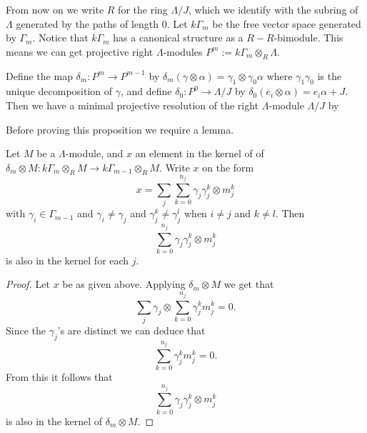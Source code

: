 From now on we write $R$ for the ring $\Lambda/J$, which we identify with the subring of $\Lambda$ generated by the paths of length 0. Let $k\Gamma_m$ be the free vector space generated by $\Gamma_m$. Notice that $k\Gamma_m$ has a canonical structure as a $R-R$-bimodule. This means we can get projective right $\Lambda$-modules $P^m := k\Gamma_m\otimes_R\Lambda$.

\begin{prop}\label{prop:projective_res_of_top_monomial_alg}
Define the map $\delta_m \colon P^m \to P^{m-1}$ by $\delta_m(\gamma \otimes \alpha) = \gamma_1 \otimes \gamma_0\alpha$ where $\gamma_1\gamma_0$ is the unique decomposition of $\gamma$, and define $\delta_0 \colon P^0 \to \Lambda /J$ by $\delta_0(e_i\otimes \alpha) = e_i\alpha + J$. Then we have a minimal projective resolution of the right $\Lambda$-module $\Lambda/J$ by

\begin{center}
\end{center}
\end{prop}

Before proving this proposition we require a lemma.

\begin{lemma}\cite[Lemma~2.1]{GKK91}\label{lem:decompose_kernel_delta_m}
	Let $M$ be a $\Lambda$-module, and $x$ an element in the kernel of of $\delta_m\otimes M\colon k\Gamma_m\otimes_R M \to k\Gamma_{m-1} \otimes_R M$. Write $x$ on the form
	$$x = \sum_j\sum_{k=0}^{n_j} \gamma_j  \gamma_j^k \otimes m_j^k$$
	with $\gamma_i \in \Gamma_{m-1}$ and $\gamma_i \neq \gamma_j$ and $\gamma_j^k \neq \gamma_j^l$ when $i \neq j$ and $k \neq l$. Then 
	$$\sum_{k=0}^{n_j} \gamma_j  \gamma_j^k \otimes m_j^k$$
	is also in the kernel for each $j$.
	\begin{proof}
		Let $x$ be as given above. Applying $\delta_m\otimes M$ we get that 
		$$\sum_j \gamma_j \otimes \sum_{k=0}^{n_j} \gamma_j^{k}m_j^{k}=0.$$ 
		Since the $\gamma_j$'s are distinct we can deduce that 
		$$ \sum_{k=0}^{n_j} \gamma_j^{k}m_j^{k}=0.$$ 
		From this it follows that
		$$\sum_{k=0}^{n_j} \gamma_j  \gamma_j^k \otimes m_j^k$$
		is also in the kernel of $\delta_m \otimes M$.
	\end{proof}
\end{lemma}

